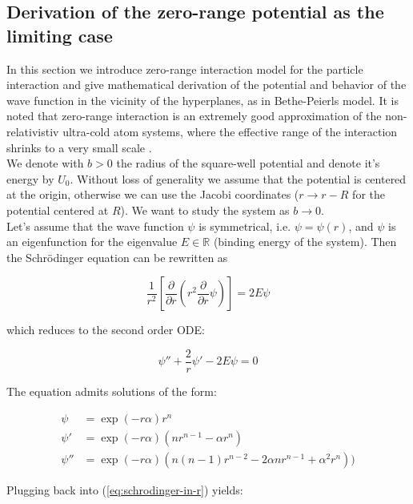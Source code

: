 \documentclass[11pt, a4paper, german]{article}
\theoremstyle{plain}
\theoremstyle{definition}
\theoremstyle{remark}
\numberwithin{equation}{section}
\numberwithin{theorem}{section}
\begin{document}
\subsection{Derivation of the zero-range potential as the limiting case}

In this section we introduce zero-range interaction model for the particle interaction and give mathematical derivation of the potential and behavior of the wave function in the vicinity of the hyperplanes, as in Bethe-Peierls model. It is noted that zero-range interaction is an extremely good approximation of the non-relativistiv ultra-cold atom systems, where the effective range of the interaction shrinks to a very small scale \cite{A2}.\\

We denote with $b>0$ the radius of the square-well potential and denote it's energy by $U_0$. Without loss of generality we assume that the potential is centered at the origin, otherwise we can use the Jacobi coordinates ($r \rightarrow r - R$ for the potential centered at $R$). We want to study the system as $b\rightarrow 0$.\\

Let's assume that the wave function $\psi$ is symmetrical, i.e. $\psi = \psi(r)$, and $\psi$ is an eigenfunction for the eigenvalue $E\in \mathbb R$ (binding energy of the system). Then the Schrödinger equation can be rewritten as

\begin{equation}
\frac{1}{r^2}\left[\frac{\partial}{\partial r} (r^2 \frac{\partial}{\partial r} \psi)\right] = 2E \psi
\end{equation}

which reduces to the second order ODE:

\begin{equation}
\psi''+\frac 2r \psi ' - 2E \psi = 0 \label{eq:schrodinger-in-r}
\end{equation}

The equation admits solutions of the form:

\begin{align}
\psi &= \exp(-r\alpha) r^n \\
\psi' &= \exp(-r\alpha) ( n r^{n-1}  - \alpha r^n)\\
\psi'' &= \exp(-r\alpha) (n(n-1) r^{n-2} - 2 \alpha n r^{n-1} + \alpha^2 r^n) )
\end{align}

Plugging back into (\ref{eq:schrodinger-in-r}) yields:
\end{document}
